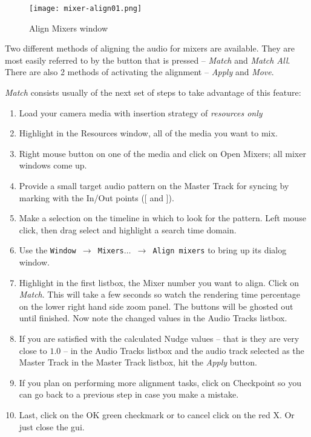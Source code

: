 \begin{figure}[htpb]
    \centering
    \texttt{[image: mixer-align01.png]}
    \caption{Align Mixers window}
    \label{fig:mixer-align01}
\end{figure}

Two different methods of aligning the audio for mixers are available. They are most easily referred to by the button that is pressed -- \textit{Match} and \textit{Match All}. There are also 2 methods of activating the alignment -- \textit{Apply} and \textit{Move}.  

\textit{Match} consists usually of the next set of steps to take advantage of this feature:

\begin{enumerate}
    \item Load your camera media with insertion strategy of \textit{resources only}
    \item Highlight in the Resources window, all of the media you want to mix.
    \item Right mouse button on one of the media and click on Open Mixers; all mixer windows come up.
    \item Provide a small target audio pattern on the Master Track for syncing by marking with the In/Out points ([ and ]).
    \item Make a selection on the timeline in which to look for the pattern. Left mouse click, then drag select and highlight a search time domain.
    \item Use the \texttt{Window $\rightarrow$ Mixers$\dots$ $\rightarrow$  Align mixers} to bring up its dialog window.
    \item Highlight in the first listbox, the Mixer number you want to align. Click on \textit{Match}. This will take a few seconds so watch the rendering time percentage on the lower right hand side zoom panel. The buttons will be ghosted out until finished. Now note the changed values in the Audio Tracks listbox.
    \item If you are satisfied with the calculated Nudge values -- that is they are very close to $1.0$ -- in the Audio Tracks listbox and the audio track selected as the Master Track in the Master Track listbox, hit the \textit{Apply} button.
    \item If you plan on performing more alignment tasks, click on Checkpoint so you can go back to a previous step in case you make a mistake.
    \item Last, click on the OK green checkmark or to cancel click on the red X.  Or just close the gui.
\end{enumerate}

